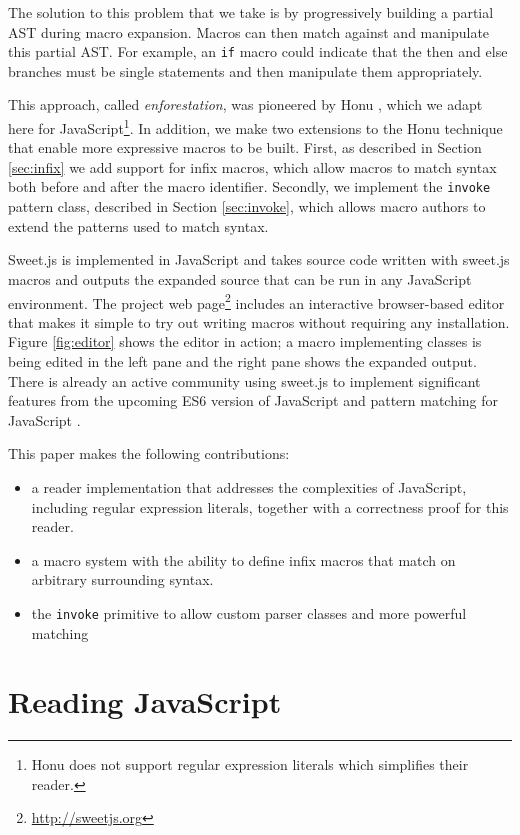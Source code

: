 \documentclass[preprint,10pt]{sigplanconf}
\begin{document}
The solution to this problem that we take is by progressively building
a partial AST during macro expansion. Macros can then match against
and manipulate this partial AST. For example, an \verb!if! macro
could indicate that the then and else branches must be single
statements and then manipulate them appropriately.


This approach, called \emph{enforestation}, was pioneered by Honu
\cite{Rafkind2012,Rafkind2013}, which we adapt here for
JavaScript\footnote{Honu does not support regular expression literals
  which simplifies their reader. }. In addition, we make two
extensions to the Honu technique that enable more expressive macros to be built. First, as described in Section
\ref{sec:infix} we add support for infix macros, which allow macros to
match syntax both before and after the macro identifier. Secondly, we
implement the \verb!invoke! pattern class, described in Section
\ref{sec:invoke}, which allows macro authors to extend the patterns
used to match syntax.

Sweet.js is implemented in JavaScript and takes source code written with sweet.js macros and outputs the expanded source that can be run in any JavaScript environment. 
The project web page\footnote{\url{http://sweetjs.org}} includes an interactive browser-based editor that makes it simple to try out writing macros without requiring any installation.
Figure \ref{fig:editor} shows the editor in action; a macro implementing classes is being edited in the left pane and the right pane shows the expanded output.
There is already an active community using sweet.js to implement
significant features from the upcoming ES6 version of JavaScript \cite{Long} and pattern matching for JavaScript \cite{Faubion}.

This paper makes the following contributions:

\begin{itemize}
\item a reader implementation that addresses the complexities of
  JavaScript, including regular expression literals, together with a
  correctness proof for this reader.
\item a macro system with the ability to define infix macros that
  match on arbitrary surrounding syntax.
\item the \texttt{invoke} primitive to allow custom parser classes and
  more powerful matching
\end{itemize}



\section{Reading JavaScript}
\label{sec:read}
\end{document}
